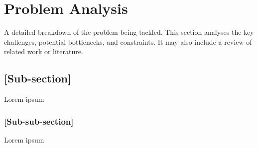 \chapter{Problem Analysis} 
A detailed breakdown of the problem being tackled. This section analyses the key challenges, potential bottlenecks, and constraints. It may also include a review of related work or literature. 

\section{[Sub-section]} Lorem ipsum 

\subsection{[Sub-sub-section]} Lorem ipsum